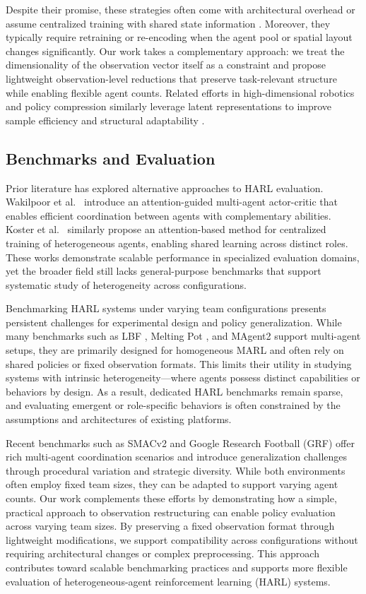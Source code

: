 \documentclass{article}
\begin{document}
Despite their promise, these strategies often come with architectural overhead or assume 
centralized training with shared state information \cite{foerster2017}. 
Moreover, they typically require retraining or re-encoding when the agent pool or spatial 
layout changes significantly. Our work takes a complementary approach: 
we treat the dimensionality of the observation vector itself as a constraint and propose 
lightweight observation-level reductions that preserve task-relevant structure 
while enabling flexible agent counts. 
Related efforts in high-dimensional robotics and policy compression similarly leverage 
latent representations to improve sample efficiency and structural adaptability 
\cite{bitzer2010, tangkaratt2016}.

\subsection{Benchmarks and Evaluation}

Prior literature has explored alternative approaches to HARL evaluation. 
Wakilpoor et al.~\cite{wakilpoor2020} introduce an attention-guided multi-agent actor-critic 
that enables efficient coordination between agents with complementary abilities. 
Koster et al.~\cite{koster2020} similarly propose an attention-based method for centralized 
training of heterogeneous agents, enabling shared learning across distinct roles. 
These works demonstrate scalable performance in specialized evaluation domains, 
yet the broader field still lacks general-purpose benchmarks that support systematic 
study of heterogeneity across configurations.

Benchmarking HARL systems under varying team configurations presents persistent
challenges for experimental design and policy generalization. While many benchmarks 
such as LBF \cite{papoudakis2021}, Melting Pot \cite{leibo2021}, and MAgent2 \cite{zheng2017} 
support multi-agent setups, they are primarily designed for homogeneous MARL 
and often rely on shared policies or fixed observation formats. This limits 
their utility in studying systems with intrinsic heterogeneity—where agents possess 
distinct capabilities or behaviors by design. As a result, dedicated HARL benchmarks 
remain sparse, and evaluating emergent or role-specific behaviors is often constrained 
by the assumptions and architectures of existing platforms.

Recent benchmarks such as SMACv2 \cite{ellis2023} and 
Google Research Football (GRF) \cite{kurach2020} offer rich multi-agent coordination scenarios 
and introduce generalization challenges through procedural variation and strategic diversity. 
While both environments often employ fixed team sizes, 
they can be adapted to support varying agent counts.
Our work complements these efforts by demonstrating how a simple, practical approach to observation 
restructuring can enable policy evaluation across varying team sizes. By preserving a fixed 
observation format through lightweight modifications, we support compatibility across configurations 
without requiring architectural changes or complex preprocessing.
This approach contributes toward scalable benchmarking practices and supports 
more flexible evaluation of heterogeneous-agent reinforcement learning (HARL) systems.
\end{document}
